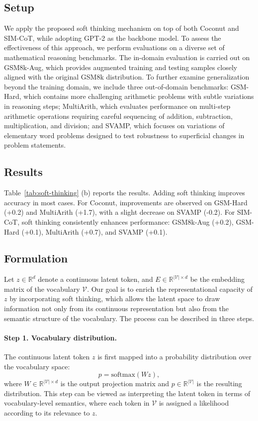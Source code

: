 \subsection{Setup}
We apply the proposed soft thinking mechanism on top of both Coconut and SIM-CoT, while adopting GPT-2 as the backbone model.
To assess the effectiveness of this approach, we perform evaluations on a diverse set of mathematical reasoning benchmarks.
The in-domain evaluation is carried out on GSM8k-Aug, which provides augmented training and testing samples closely aligned with the original GSM8k distribution.
To further examine generalization beyond the training domain, we include three out-of-domain benchmarks: GSM-Hard, which contains more challenging arithmetic problems with subtle variations in reasoning steps; MultiArith, which evaluates performance on multi-step arithmetic operations requiring careful sequencing of addition, subtraction, multiplication, and division; and SVAMP, which focuses on variations of elementary word problems designed to test robustness to superficial changes in problem statements.


\subsection{Results}
Table~\ref{tab:soft-thinking} (b) reports the results.  
Adding soft thinking improves accuracy in most cases.  
For Coconut, improvements are observed on GSM-Hard (+0.2) and MultiArith (+1.7), with a slight decrease on SVAMP (-0.2).  
For SIM-CoT, soft thinking consistently enhances performance: GSM8k-Aug (+0.2), GSM-Hard (+0.1), MultiArith (+0.7), and SVAMP (+0.1).

\subsection{Formulation}
Let $z \in \mathbb{R}^d$ denote a continuous latent token, and $E \in \mathbb{R}^{|\mathcal{V}| \times d}$ be the embedding matrix of the vocabulary $\mathcal{V}$.  
Our goal is to enrich the representational capacity of $z$ by incorporating soft thinking, which allows the latent space to draw information not only from its continuous representation but also from the semantic structure of the vocabulary. The process can be described in three steps.

\paragraph{Step 1. Vocabulary distribution.}  
The continuous latent token $z$ is first mapped into a probability distribution over the vocabulary space:
\[
p = \text{softmax}(W z),
\]
where $W \in \mathbb{R}^{|\mathcal{V}| \times d}$ is the output projection matrix and $p \in \mathbb{R}^{|\mathcal{V}|}$ is the resulting distribution.  
This step can be viewed as interpreting the latent token in terms of vocabulary-level semantics, where each token in $\mathcal{V}$ is assigned a likelihood according to its relevance to $z$.

